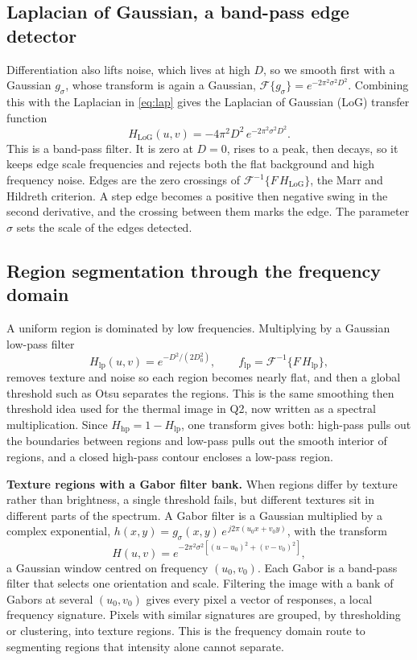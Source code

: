 \documentclass[11pt]{article}
\begin{document}
\subsection{Laplacian of Gaussian, a band-pass edge detector}
Differentiation also lifts noise, which lives at high $D$, so we smooth first
with a Gaussian $g_\sigma$, whose transform is again a Gaussian,
$\mathcal{F}\{g_\sigma\}=e^{-2\pi^2\sigma^2D^2}$. Combining this with the
Laplacian in \eqref{eq:lap} gives the Laplacian of Gaussian (LoG) transfer
function
\begin{equation}
H_{\text{LoG}}(u,v)=-4\pi^2 D^2\,e^{-2\pi^2\sigma^2 D^2}.
\end{equation}
This is a band-pass filter. It is zero at $D=0$, rises to a peak, then decays, so
it keeps edge scale frequencies and rejects both the flat background and high
frequency noise. Edges are the zero crossings of
$\mathcal{F}^{-1}\{F\,H_{\text{LoG}}\}$, the Marr and Hildreth criterion. A step
edge becomes a positive then negative swing in the second derivative, and the
crossing between them marks the edge. The parameter $\sigma$ sets the scale of
the edges detected.

\subsection{Region segmentation through the frequency domain}
A uniform region is dominated by low frequencies. Multiplying by a Gaussian
low-pass filter
\begin{equation}
H_{\text{lp}}(u,v)=e^{-D^2/(2D_0^2)},\qquad
f_{\text{lp}}=\mathcal{F}^{-1}\{F\,H_{\text{lp}}\},
\end{equation}
removes texture and noise so each region becomes nearly flat, and then a global
threshold such as Otsu separates the regions. This is the same smoothing then
threshold idea used for the thermal image in Q2, now written as a spectral
multiplication. Since $H_{\text{hp}}=1-H_{\text{lp}}$, one transform gives both:
high-pass pulls out the boundaries between regions and low-pass pulls out the
smooth interior of regions, and a closed high-pass contour encloses a low-pass
region.

\textbf{Texture regions with a Gabor filter bank.} When regions differ by texture
rather than brightness, a single threshold fails, but different textures sit in
different parts of the spectrum. A Gabor filter is a Gaussian multiplied by a
complex exponential, $h(x,y)=g_\sigma(x,y)\,e^{\,j2\pi(u_0x+v_0y)}$, with the
transform
\begin{equation}
H(u,v)=e^{-2\pi^2\sigma^2\left[(u-u_0)^2+(v-v_0)^2\right]},
\end{equation}
a Gaussian window centred on frequency $(u_0,v_0)$. Each Gabor is a band-pass
filter that selects one orientation and scale. Filtering the image with a bank of
Gabors at several $(u_0,v_0)$ gives every pixel a vector of responses, a local
frequency signature. Pixels with similar signatures are grouped, by thresholding
or clustering, into texture regions. This is the frequency domain route to
segmenting regions that intensity alone cannot separate.
\end{document}
